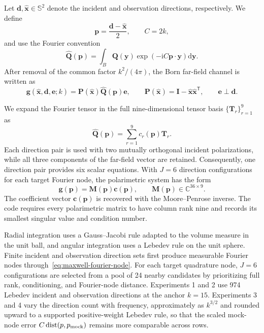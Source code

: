 Let $\mathbf{d},\widehat{\mathbf{x}}\in\mathbb{S}^2$ denote the incident and
observation directions, respectively. We define
\begin{equation}
    \mathbf{p}=\frac{\mathbf{d}-\widehat{\mathbf{x}}}{2},
    \qquad C=2k,
    \label{eq:maxwell-fourier-node}
\end{equation}
and use the Fourier convention
\begin{equation}
    \widehat{\mathbf{Q}}(\mathbf{p})
    =\int_B \mathbf{Q}(\mathbf{y})
    \exp\!\left(-\mathrm{i}C\mathbf{p}\cdot\mathbf{y}\right)
    \mathrm{d}\mathbf{y}.
    \label{eq:maxwell-qhat}
\end{equation}
After removal of the common factor $k^2/(4\pi)$, the Born far-field channel is
written as
\begin{equation}
    \mathbf{g}
    (\widehat{\mathbf{x}},\mathbf{d},\mathbf{e};k)
    =\mathbf{P}(\widehat{\mathbf{x}})
    \widehat{\mathbf{Q}}(\mathbf{p})\mathbf{e},
    \qquad
    \mathbf{P}(\widehat{\mathbf{x}})
    =\mathbf{I}-\widehat{\mathbf{x}}\widehat{\mathbf{x}}^{\mathsf T},
    \qquad \mathbf{e}\perp\mathbf{d}.
    \label{eq:maxwell-born-channel}
\end{equation}

We expand the Fourier tensor in the full nine-dimensional tensor basis
$\{\mathbf{T}_r\}_{r=1}^{9}$ as
\[
    \widehat{\mathbf{Q}}(\mathbf{p})
    =\sum_{r=1}^{9}c_r(\mathbf{p})\mathbf{T}_r.
\]
Each direction pair is used with two mutually orthogonal incident
polarizations, while all three components of the far-field vector are retained.
Consequently, one direction pair provides six scalar equations. With $J=6$
direction configurations for each target Fourier node, the polarimetric system
has the form
\begin{equation}
    \mathbf{g}(\mathbf{p})
    =\mathbf{M}(\mathbf{p})\mathbf{c}(\mathbf{p}),
    \qquad
    \mathbf{M}(\mathbf{p})\in\mathbb{C}^{36\times9}.
    \label{eq:maxwell-polarimetric-system}
\end{equation}
The coefficient vector $\mathbf{c}(\mathbf{p})$ is recovered with the
Moore--Penrose inverse. The code requires every polarimetric matrix to have
column rank nine and records its smallest singular value and condition number.

Radial integration uses a Gauss--Jacobi rule adapted to the volume measure in
the unit ball, and angular integration uses a Lebedev rule on the unit sphere.
Finite incident and observation direction sets first
produce measurable Fourier nodes through~\eqref{eq:maxwell-fourier-node}. For
each target quadrature node, $J=6$ configurations are selected from a pool of
24 nearby candidates by prioritizing full rank, conditioning, and Fourier-node
distance. Experiments 1 and 2 use 974 Lebedev incident and observation
directions at the anchor $k=15$. Experiments 3 and 4 vary the direction count
with frequency, approximately as
$k^{3/2}$ and rounded upward to a supported positive-weight Lebedev rule, so
that the scaled mock-node error $C\,\mathrm{dist}(p,p_{\rm mock})$ remains more
comparable across rows.

